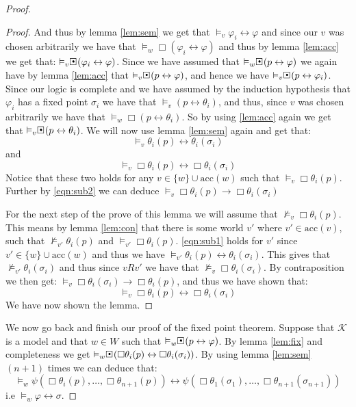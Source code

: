 \documentclass[../main.tex]{subfiles}
\begin{document}
\begin{proof}
\begin{proof}
		And thus by lemma \ref{lem:sem} we get that
		$\vDash_v\varphi_i\leftrightarrow\varphi$ and since our $v$ was
		chosen arbitrarily we have that
		$\vDash_w\Box(\varphi_i\leftrightarrow\varphi)$ and thus by
		lemma \ref{lem:acc} we get that:
		$\vDash_v\sBox(\varphi_i\leftrightarrow\varphi)$. Since we have
		assumed that $\vDash_w\sBox(p\leftrightarrow\varphi)$ we again
		have by lemma \ref{lem:acc} that
		$\vDash_v\sBox(p\leftrightarrow\varphi)$, and hence we have
		$\vDash_v\sBox(p\leftrightarrow\varphi_i)$. Since our logic is
		complete and we have assumed by the induction hypothesis that
		$\varphi_i$ has a fixed point $\sigma_i$ we have that
		$\vDash_v(p\leftrightarrow\theta_i)$, and thus, since $v$ was
		chosen arbitrarily we have that
		$\vDash_w\Box(p\leftrightarrow\theta_i)$. So by using
		\ref{lem:acc} again we get that
		$\vDash_v\sBox(p\leftrightarrow\theta_i)$. We will now use
		lemma \ref{lem:sem} again and get that:
		\begin{equation}
			\label{eqn:sub1}
			\vDash_v\theta_i(p)\leftrightarrow\theta_i(\sigma_i)
		\end{equation}
		and
		\begin{equation}
			\label{eqn:sub2}
			\vDash_v\Box\theta_i(p)\leftrightarrow\Box\theta_i(\sigma_i)
		\end{equation}
		Notice that these two holds for any $v\in\{w\}\cup\text{acc}(w)$ such that
		$\vDash_v\Box\theta_i(p)$.
		Further by \ref{eqn:sub2} we can deduce
		$\vDash_v\Box\theta_i(p)\rightarrow\Box\theta_i(\sigma_i)$

		For the next step of the prove of this lemma we will assume that
		$\not\vDash_v\Box\theta_i(p)$. This means by lemma
		\ref{lem:con} that there is some world $v'$ where
		$v'\in\text{acc}(v)$, such that $\not\vDash_{v'}\theta_i(p)$
		and $\vDash_{v'}\Box\theta_i(p)$. \ref{eqn:sub1} holds for $v'$
		since $v'\in\{w\}\cup\text{acc}(w)$ and thus we have
		$\vDash_{v'}\theta_i(p)\leftrightarrow\theta_i(\sigma_i)$. This
		gives that $\not\vDash_{v'}\theta_i(\sigma_i)$ and thus since
		$vRv'$ we have that $\not\vDash_v\Box\theta_i(\sigma_i)$. By
		contraposition we then get:
		$\vDash_v\Box\theta_i(\sigma_i)\rightarrow\Box\theta_i(p)$, and
		thus we have shown that:
		$$\vDash_v\Box\theta_i(p)\leftrightarrow\Box\theta_i(\sigma_i)$$
		We have now shown the lemma.
	\end{proof}
	We now go back and finish our proof of the fixed point theorem. Suppose
	that $\mathcal{K}$ is a model and that $w\in W$ such that
	$\vDash_w\sBox(p\leftrightarrow\varphi)$. By lemma \ref{lem:fix} and
	completeness we get
	$\vDash_w\sBox(\Box\theta_i(p)\leftrightarrow\Box\theta_i(\sigma_i))$.
	By using lemma \ref{lem:sem} $(n+1)$ times we can deduce that:
	$$\vDash_w\psi(\Box\theta_i(p),\ldots,\Box\theta_{n+1}(p))\leftrightarrow\psi(
	\Box\theta_1(\sigma_1),\ldots,\Box\theta_{n+1}(\sigma_{n+1}))$$
	i.e $\vDash_w\varphi\leftrightarrow\sigma$. 


\end{proof}
\end{document}
